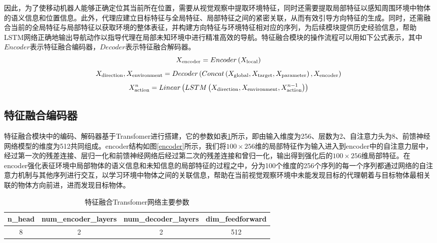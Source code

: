 因此，为了使移动机器人能够正确定位其当前所在位置，需要从视觉观察中提取环境特征，同时还需要提取局部特征以感知周围环境中物体的语义信息和位置信息。此外，代理应建立目标特征与全局特征、局部特征之间的紧密关联，从而有效引导方向特征的生成。同时，还需融合当前的全局特征与局部特征以获取环境的整体表征，并构建方向特征与环境特征相对应的序列，为后续模块提供历史经验信息，帮助LSTM网络正确地输出导航动作以指导代理在局部未知环境中进行精准高效的导航。特征融合模块的操作流程可以用如下公式表示，其中$Encoder$表示特征融合编码器，$Decoder$表示特征融合解码器。
\begin{equation}
{X_{{\rm{encoder}}}} = Encoder\left( {{X_{{\rm{local}}}}} \right)
    \label{myeq37}
\end{equation}
\begin{equation}
    {X_{{\rm{direction}}}},{X_{{\rm{environment}}}} = Decoder\left( {Concat\left( {{X_{{\rm{global}}}},{X_{{\rm{target}}}},{X_{{\rm{parameter}}}}} \right),{X_{{\rm{encoder}}}}} \right)
    \label{myeq38}
\end{equation}
\begin{equation}
    X_{{\rm{action}}}^n = Linear\left( {LSTM\left( {{X_{{\rm{direction}}}},{X_{{\rm{environment}}}},X_{{\rm{action}}}^{n - 1}} \right)} \right)
    \label{myeq39}
\end{equation}

\subsection{特征融合编码器}
特征融合模块中的编码、解码器基于Transfomer进行搭建，它的参数如表\ref{特征融合tf参数}所示，即由输入维度为256、层数为2、自注意力头为8、前馈神经网络模型的维度为512共同组成。encoder结构如图\ref{encoder}所示，我们将$100 \times 256$维的局部特征作为输入进入到encoder中的自注意力层中，经过第一次的残差连接、层归一化和前馈神经网络后经过第二次的残差连接和曾归一化，输出得到强化后的$100 \times 256$维局部特征。在encoder强化表征环境中局部物体的语义信息和未知信息的局部特征的过程之中，分为100个维度的256个序列的每一个序列都通过网络的自注意力机制与其他序列进行交互，以学习环境中物体之间的关联信息，帮助在当前视觉观察环境中未能发现目标的代理朝着与目标物体最相关联的物体方向前进，进而发现目标物体。
\begin{table}
\caption{\label{特征融合tf参数}特征融合Transfomer网络主要参数}
\centering
\small
\begin{tabular}{cccc}
    \hline
    n\_head & num\_encoder\_layers & num\_decoder\_layers & dim\_feedforward \tabularnewline 
    \hline 
    8 & 2 & 2 & 512 \tabularnewline
    \hline 
\end{tabular}
\end{table}

